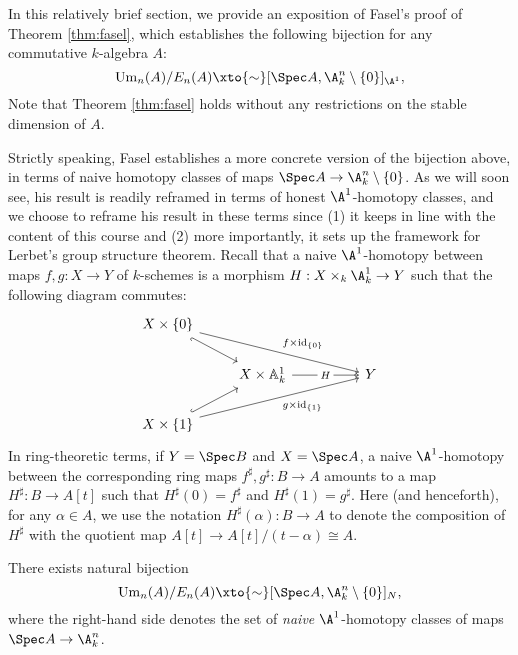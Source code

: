 In this relatively brief section, we provide an exposition of Fasel's proof of Theorem \ref{thm:fasel}, which establishes the following bijection for any commutative $k$-algebra $A$:
\[
\mathrm{Um}_n(A)/E_n(A) \xto{\sim} [\Spec A, \A^n_k\setminus \{0\}]_{\A^1},
\]
Note that Theorem \ref{thm:fasel} holds without any restrictions on the stable dimension of $A$.

Strictly speaking, Fasel establishes a more concrete version of the bijection above, in terms of naive homotopy classes of maps $\Spec A \to \A^n_k\setminus\{0\}$. As we will soon see, his result is readily reframed in terms of honest $\A^1$-homotopy classes, and we choose to reframe his result in these terms since (1) it keeps in line with the content of this course and (2) more importantly, it sets up the framework for Lerbet's group structure theorem. Recall that a naive $\A^1$-homotopy between maps $f,g: X \to Y$ of $k$-schemes is a morphism $H: X \times_k \A^1_k \to Y$ such that the following diagram commutes:
\[\begin{tikzcd}
	{X \times\{0\}} \\
	& {X \times\mathbb{A}^1_k} && Y \\
	{X \times \{1\}}
	\arrow[hook', from=1-1, to=2-2]
	\arrow["{f \times \operatorname{id}_{\{0\}}}", from=1-1, to=2-4]
	\arrow["H"{description}, from=2-2, to=2-4]
	\arrow[hook, from=3-1, to=2-2]
	\arrow["{g \times \operatorname{id}_{\{1\}}}"', from=3-1, to=2-4]
\end{tikzcd}\]
In ring-theoretic terms, if $Y = \Spec B$ and $X = \Spec A$, a naive $\A^1$-homotopy between the corresponding ring maps $f^\sharp, g^\sharp: B \to A$ amounts to a map $H^\sharp: B \to A[t]$ such that $H^\sharp(0) = f^\sharp$ and $H^\sharp(1) = g^\sharp$. Here (and henceforth), for any $\alpha \in A$, we use the notation $H^\sharp(\alpha): B \to A$ to denote the composition of $H^\sharp$ with the quotient map $A[t] \to A[t]/(t - \alpha) \cong A$.

\begin{proposition}\cite[Theorem 2.1]{Fasel_2010}\label{prop:fasel_naive}
    There exists natural bijection
    \[
    \mathrm{Um}_n(A)/E_n(A) \xto{\sim} [\Spec A, \A^n_k\setminus \{0\}]_{N},
    \]
    where the right-hand side denotes the set of \textit{naive} $\A^1$-homotopy classes of maps $\Spec A \to \A^n_k$. 
\end{proposition}

